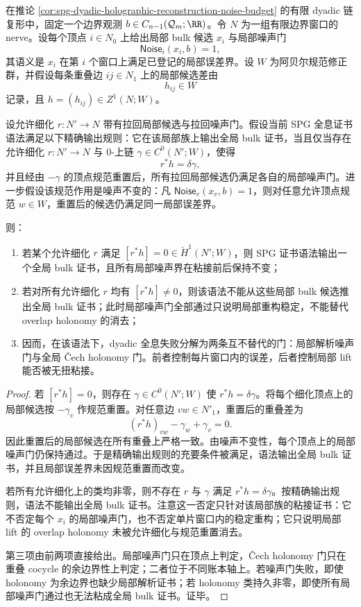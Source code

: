 \begin{proposition}\label{distill:cech_cohomology-local_to_global_certificate_descent-spg-noise-invariant-cech-gluing-gate}
在推论 \ref{cor:spg-dyadic-holographic-reconstruction-noise-budget} 的有限 dyadic 链复形中，固定一个边界观测 \(b\in C_{n-1}(\mathcal Q_m;\RR)\)。令 \(N\) 为一组有限边界窗口的 nerve。设每个顶点 \(i\in N_0\) 上给出局部 bulk 候选 \(x_i\) 与局部噪声门
\[
\mathsf{Noise}_i(x_i,b)=1,
\]
其语义是 \(x_i\) 在第 \(i\) 个窗口上满足已登记的局部误差界。设 \(W\) 为阿贝尔规范修正群，并假设每条重叠边 \(ij\in N_1\) 上的局部候选差由
\[
h_{ij}\in W
\]
记录，且 \(h=(h_{ij})\in Z^1(N;W)\)。

设允许细化 \(r:N'\to N\) 带有拉回局部候选与拉回噪声门。假设当前 SPG 全息证书语法满足以下精确输出规则：它在该局部族上输出全局 bulk 证书，当且仅当存在允许细化 \(r:N'\to N\) 与 \(0\)-上链 \(\gamma\in C^0(N';W)\)，使得
\[
r^\ast h=\delta\gamma,
\]
并且经由 \(-\gamma\) 的顶点规范重置后，所有拉回局部候选仍满足各自的局部噪声门。进一步假设该规范作用是噪声不变的：凡 \(\mathsf{Noise}_v(x_v,b)=1\)，则对任意允许顶点规范 \(w\in W\)，重置后的候选仍满足同一局部误差界。

则：
\begin{enumerate}
  \item 若某个允许细化 \(r\) 满足 \([r^\ast h]=0\in\check H^1(N';W)\)，则 SPG 证书语法输出一个全局 bulk 证书，且所有局部噪声界在粘接前后保持不变；
  \item 若对所有允许细化 \(r\) 均有 \([r^\ast h]\ne0\)，则该语法不能从这些局部 bulk 候选推出全局 bulk 证书；此时局部噪声门全部通过只说明局部重构稳定，不能替代 overlap holonomy 的消去；
  \item 因而，在该语法下，dyadic 全息失败分解为两条互不替代的门：局部解析噪声门与全局 \v Cech holonomy 门。前者控制每片窗口内的误差，后者控制局部 lift 能否被无扭粘接。
\end{enumerate}
\end{proposition}
\begin{proof}
若 \([r^\ast h]=0\)，则存在 \(\gamma\in C^0(N';W)\) 使 \(r^\ast h=\delta\gamma\)。将每个细化顶点上的局部候选按 \(-\gamma_v\) 作规范重置。对任意边 \(vw\in N'_1\)，重置后的重叠差为
\[
(r^\ast h)_{vw}-\gamma_w+\gamma_v=0.
\]
因此重置后的局部候选在所有重叠上严格一致。由噪声不变性，每个顶点上的局部噪声门仍保持通过。于是精确输出规则的充要条件被满足，语法输出全局 bulk 证书，并且局部误差界未因规范重置而改变。

若所有允许细化上的类均非零，则不存在 \(r\) 与 \(\gamma\) 满足 \(r^\ast h=\delta\gamma\)。按精确输出规则，语法不能输出全局 bulk 证书。注意这一否定只针对该局部族的粘接证书：它不否定每个 \(x_i\) 的局部噪声门，也不否定单片窗口内的稳定重构；它只说明局部 lift 的 overlap holonomy 未被允许细化与规范重置消去。

第三项由前两项直接给出。局部噪声门只在顶点上判定，\v Cech holonomy 门只在重叠 cocycle 的余边界性上判定；二者位于不同账本轴上。若噪声门失败，即使 holonomy 为余边界也缺少局部解析证书；若 holonomy 类持久非零，即使所有局部噪声门通过也无法粘成全局 bulk 证书。证毕。
\end{proof}

